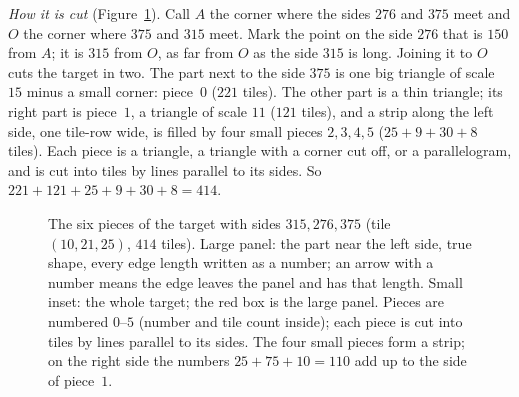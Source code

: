 \documentclass[11pt,reqno]{amsart}
\theoremstyle{plain}
\theoremstyle{definition}
\begin{document}
\emph{How it is cut} (Figure~\ref{fig:one}). Call $A$ the corner where the sides $276$ and $375$ meet and $O$ the corner where $375$ and $315$ meet. Mark the point on the side $276$ that is $150$ from $A$; it is $315$ from $O$, as far from $O$ as the side $315$ is long. Joining it to $O$ cuts the target in two. The part next to the side $375$ is one big triangle of scale $15$ minus a small corner: piece~$0$ ($221$ tiles). The other part is a thin triangle; its right part is piece~$1$, a triangle of scale $11$ ($121$ tiles), and a strip along the left side, one tile-row wide, is filled by four small pieces $2,3,4,5$ ($25+9+30+8$ tiles). Each piece is a triangle, a triangle with a corner cut off, or a parallelogram, and is cut into tiles by lines parallel to its sides. So $221+121+25+9+30+8=414$.

\begin{figure}[ht]
\centering

\caption{The six pieces of the target with sides $315,276,375$ (tile $(10,21,25)$, $414$ tiles). Large panel: the part near the left side, true shape, every edge length written as a number; an arrow with a number means the edge leaves the panel and has that length. Small inset: the whole target; the red box is the large panel. Pieces are numbered $0$--$5$ (number and tile count inside); each piece is cut into tiles by lines parallel to its sides. The four small pieces form a strip; on the right side the numbers $25+75+10=110$ add up to the side of piece~$1$.}\label{fig:one}
\end{figure}
\end{document}
